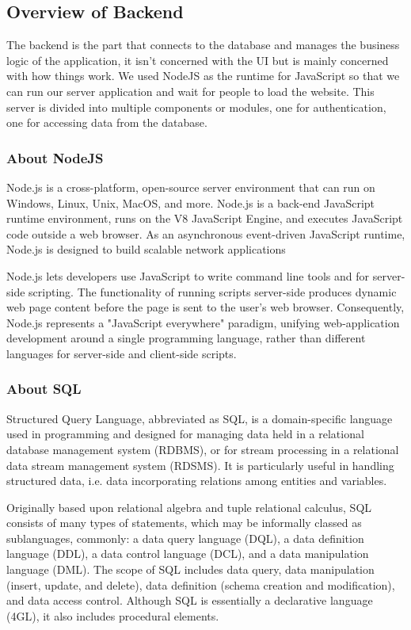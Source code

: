 \subsection{Overview of Backend}
The backend is the part that connects to the database and manages the business
logic of the application, it isn't concerned with the UI but is mainly concerned
with how things work. We used NodeJS as the runtime for JavaScript so that we
can run our server application and wait for people to load the website. This
server is divided into multiple components or modules, one for authentication,
one for accessing data from the database.

\subsubsection{About NodeJS}
Node.js is a cross-platform, open-source server environment that can run on
Windows, Linux, Unix, MacOS, and more. Node.js is a back-end JavaScript runtime
environment, runs on the V8 JavaScript Engine, and executes JavaScript code
outside a web browser. As an asynchronous event-driven JavaScript runtime,
Node.js is designed to build scalable network applications

Node.js lets developers use JavaScript to write command line tools and for
server-side scripting. The functionality of running scripts server-side produces
dynamic web page content before the page is sent to the user's web browser.
Consequently, Node.js represents a "JavaScript everywhere" paradigm, unifying
web-application development around a single programming language, rather than
different languages for server-side and client-side scripts.

\subsubsection{About SQL}
Structured Query Language, abbreviated as SQL, is a domain-specific language
used in programming and designed for managing data held in a relational
database management system (RDBMS), or for stream processing in a relational
data stream management system (RDSMS). It is particularly useful in handling
structured data, i.e. data incorporating relations among entities and
variables.

Originally based upon relational algebra and tuple relational calculus, SQL
consists of many types of statements, which may be informally classed as
sublanguages, commonly: a data query language (DQL), a data definition
language (DDL), a data control language (DCL), and a data manipulation
language (DML). The scope of SQL includes data query, data manipulation
(insert, update, and delete), data definition (schema creation and
modification), and data access control. Although SQL is essentially a
declarative language (4GL), it also includes procedural elements.


